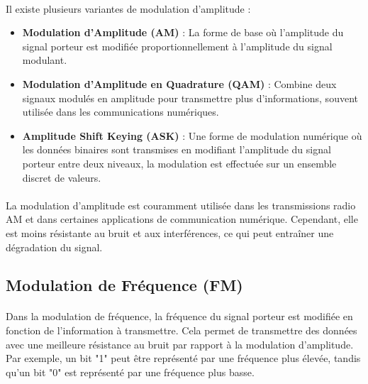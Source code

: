 \documentclass[a4paper,twocolumn]{report}
\begin{document}
\paragraph{}Il existe plusieurs variantes de modulation d'amplitude :
\begin{itemize}
	\item \textbf{Modulation d'Amplitude (AM)} :
    La forme de base où l'amplitude du signal porteur est modifiée proportionnellement à l'amplitude du signal modulant.
	\item \textbf{Modulation d'Amplitude en Quadrature (QAM)} :
    Combine deux signaux modulés en amplitude pour transmettre plus d'informations,
    souvent utilisée dans les communications numériques.
	\item \textbf{Amplitude Shift Keying (ASK)} :
    Une forme de modulation numérique où les données binaires sont transmises en
    modifiant l'amplitude du signal porteur entre deux niveaux,
    la modulation est effectuée sur un ensemble discret de valeurs.
\end{itemize}
\paragraph{}La modulation d'amplitude est couramment utilisée dans les transmissions
radio AM et dans certaines applications de communication numérique. Cependant,
elle est moins résistante au bruit et aux interférences, ce qui peut entraîner une dégradation du signal.

\subsection{Modulation de Fréquence (FM)}
\paragraph{}Dans la modulation de fréquence, la fréquence du signal porteur est
modifiée en fonction de l'information à transmettre. Cela permet de transmettre
des données avec une meilleure résistance au bruit par rapport à la modulation d'amplitude.
Par exemple, un bit "1" peut être représenté par une fréquence plus élevée,
tandis qu'un bit "0" est représenté par une fréquence plus basse.
\end{document}
